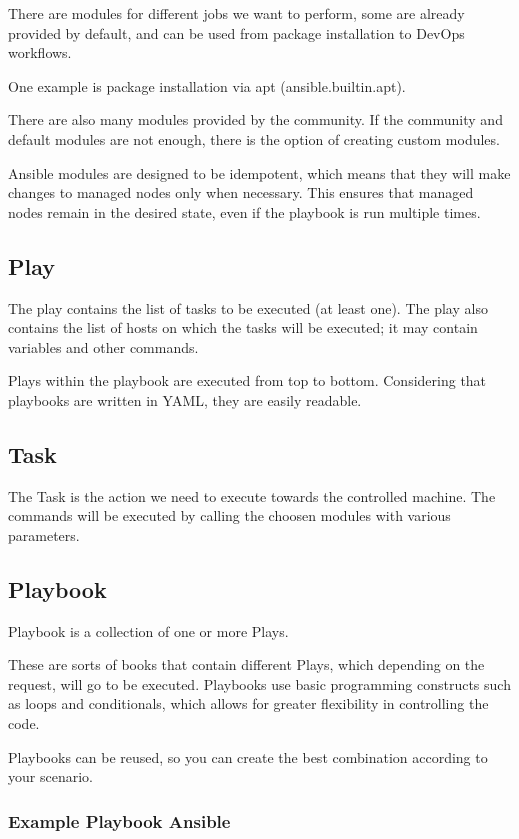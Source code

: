 \documentclass[12pt,a4paper,openright,twoside]{book}
\begin{document}
There are modules for different jobs we want to perform, some are already provided by default, and can be used from package installation to DevOps workflows.


One example is package installation via apt (ansible.builtin.apt).


There are also many modules provided by the community. If the community and default modules are not enough, there is the option of creating custom modules\cite{ansibleDocNewModules}.


Ansible modules are designed to be idempotent, which means that they will make changes to managed nodes only when necessary. This ensures that managed nodes remain in the desired state, even if the playbook is run multiple times.

\subsection{Play}
The play contains the list of tasks to be executed (at least one). The play also contains the list of hosts on which the tasks will be executed; it may contain variables and other commands.


Plays within the playbook are executed from top to bottom. Considering that playbooks are written in YAML, they are easily readable.

\subsection{Task}
The Task is the action we need to execute towards the controlled machine. The commands will be executed by calling the choosen modules with various parameters.

\subsection{Playbook}
Playbook is a collection of one or more Plays.


These are sorts of books that contain different Plays, which depending on the request, will go to be executed. Playbooks use basic programming constructs such as loops and conditionals, which allows for greater flexibility in controlling the code.


Playbooks can be reused, so you can create the best combination according to your scenario.

\subsubsection{Example Playbook Ansible}
\end{document}
